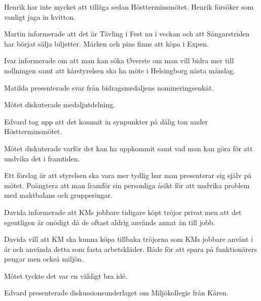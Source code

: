 \documentclass[10pt]{article}
\begin{document}
\begin{paragrafer}
\begin{paragrafer}
Henrik har inte mycket att tilläga sedan Höstterminsmötet. Henrik försöker som vanligt jaga in kvitton. 


Martin informerade att det är Tävling i Fest nu i veckan och att Sångarstriden har börjat sälja biljetter. Märken och pins finns att köpa i Expen. 

Ivar informerade om att man kan söka Øverste om man vill bidra mer till nollningen samt att kårstyrelsen ska ha möte i Helsingborg nästa måndag. 

\end{paragrafer}

Matilda presenterade svar från bidragsmedaljens nomineringsenkät.

Mötet diskuterade medaljutdelning. 


Edvard tog upp att det kommit in synpunkter på dålig ton under Höstterminsmötet. 

Mötet diskuterade varför det kan ha uppkommit samt vad man kan göra för att undvika det i framtiden. 

Ett förslag är att styrelsen ska vara mer tydlig hur man presenterar sig själv på mötet. Poängtera att man framför sin personliga åsikt för att undvika problem med maktbalans och grupperingar. 






Davida informerade att KMs jobbare tidigare köpt tröjor privat men att det egentligen är onödigt då de oftast aldrig används annat än till jobb. 

Davida vill att KM ska kunna köpa tillbaka tröjorna som KMs jobbare använt i år och använda detta som fasta arbetskläder. Både för att spara på funktionärers pengar men också miljön. 

Mötet tyckte det var en väldigt bra idé. 


Edvard presenterade diskussionsunderlaget om Miljökollegie från Kåren. 


\end{paragrafer}
\end{document}
